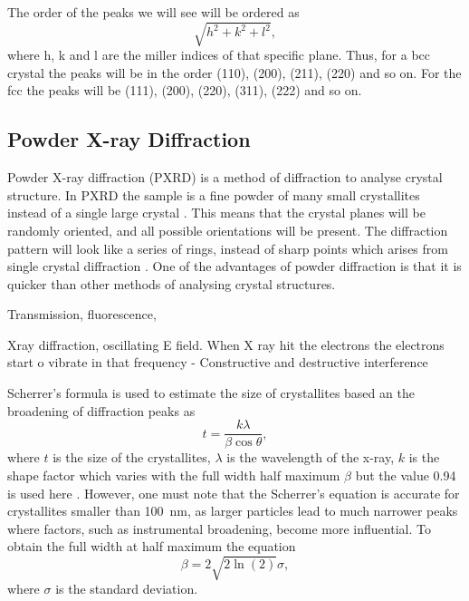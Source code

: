 The order of the peaks we will see will be ordered as 
\begin{equation}
    \sqrt{h^2+k^2+l^2},
    \label{eq:ordering}
\end{equation}  
where h, k and l are the miller indices of that specific plane. Thus, for a bcc crystal the peaks will be in the order (110), (200), (211), (220) and so on. For the fcc the peaks will be (111), (200), (220), (311), (222) and so on.  

\subsection{Powder X-ray Diffraction}
Powder X-ray diffraction (PXRD) is a method of diffraction to analyse crystal structure. In PXRD the sample is a fine powder of many small crystallites instead of a single large crystal \cite{hofmann2015}. This means that the crystal planes will be randomly oriented, and all possible orientations will be present. The diffraction pattern will look like a series of rings, instead of sharp points which arises from single crystal diffraction \cite{hofmann2015}. One of the advantages of powder diffraction is that it is quicker than other methods of analysing crystal structures.


Transmission, fluorescence, 

Xray diffraction, oscillating E field. When X ray hit the electrons the electrons start o vibrate in that frequency
- Constructive and destructive interference 


Scherrer's formula is used to estimate the size of crystallites based an the broadening of diffraction peaks as 
\begin{equation}
    t=\frac{k\lambda}{\beta\cos\theta},
    \label{eq:Scherre}
\end{equation}
where $t$ is the size of the crystallites, $\lambda$ is the wavelength of the x-ray, $k$ is the shape factor which varies with the full width half maximum $\beta$ but the value 0.94 is used here \cite{solidstatephysics2025}. However, one must note that the Scherrer's equation is accurate for crystallites smaller than \SI[scientific-notation=false]{100}{\nano\m}, as larger particles lead to much narrower peaks where factors, such as instrumental broadening, become more influential. To obtain the full width at half maximum the equation 
\begin{equation}
    \beta =2\sqrt{2 \ln(2)}\sigma,
    \label{eq:FWHM}
\end{equation}
where $\sigma$ is the standard deviation. 
